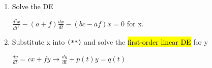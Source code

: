 \documentclass{article}
\begin{document}
\begin{itemize}
\begin{enumerate}
        \item Solve the DE   
          \begin{center}
            $\frac{d^2x}{dt^2} - (a+f)\frac{dx}{dt} - (bc-af)x = 0$ for x.
          \end{center}
        \item Substitute x into \texttt{(**)} and solve the \hl{first-order linear DE} for y
        \begin{center}
          $\frac{dy}{dt} = cx + fy \rightarrow \frac{dy}{dt} + p(t)y = q(t)$

        \end{center}       
      \end{enumerate}
    \end{itemize}
\end{document}
